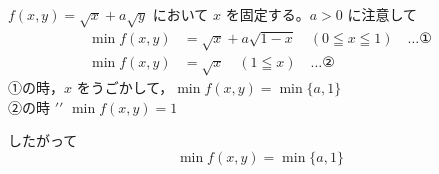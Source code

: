 \documentclass[../main.tex]{subfiles}
\begin{document}
\vspace{1em}

\vspace{0.5em}
\noindent
$f(x, y) = \sqrt{x} + a\sqrt{y}$ において $x$ を固定する。$a > 0$ に注意して
\[
  \begin{aligned}
    \min f(x, y) &= \sqrt{x} + a\sqrt{1-x} \quad (0 \leqq x \leqq 1) \quad \dots \text{①} \\
    \min f(x, y) &= \sqrt{x} \quad (1 \leqq x) \quad \dots \text{②}
  \end{aligned}
\]
①の時，$x$ をうごかして，$\min f(x, y) = \min \{a, 1\}$\\
②の時 \quad $\prime\prime$ \quad $\min f(x, y) = 1$

\vspace{0.5em}
\noindent
したがって
\[
  \min f(x, y) = \min \{a, 1\}
\]
\end{document}
